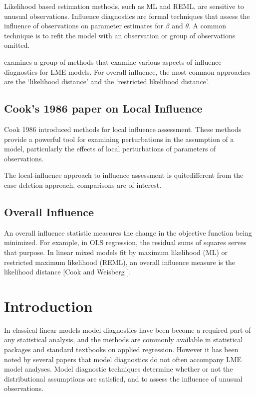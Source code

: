 \documentclass[12pt, a4paper]{article}
\begin{document}
Likelihood based estimation methods, such as ML and REML, are sensitive to unusual observations. Influence diagnostics are formal techniques that assess the influence of observations on parameter estimates for $\beta$ and $\theta$. A common technique is to refit the model with an observation or group of observations omitted.


\citet{west} examines a group of methods that examine various aspects of influence diagnostics for LME models.
For overall influence, the most common approaches are the `likelihood distance' and the `restricted likelihood distance'.


\subsection{Cook's 1986 paper on Local Influence}%
Cook 1986 introduced methods for local influence assessment. These methods provide a powerful tool for examining perturbations in the assumption of a model, particularly the effects of local perturbations of parameters of observations.


The local-influence approach to influence assessment is quitedifferent from the case deletion approach, comparisons are of
interest.






\subsection{Overall Influence}
An overall influence statistic measures the change in the objective function being minimized. For example, in
OLS regression, the residual sums of squares serves that purpose. In linear mixed models fit by
 maximum likelihood (ML) or  restricted maximum likelihood (REML), an overall influence measure is the  likelihood distance [Cook and Weisberg ].

			
			
			
			\section{Introduction}%
			In classical linear models model diagnostics have been become a required part of any statistical analysis, and the methods are commonly available in statistical packages and standard textbooks on applied regression. However it has been noted by several papers that model diagnostics do not often accompany LME model analyses.
			Model diagnostic techniques determine whether or not the distributional assumptions are satisfied, and to assess the influence of unusual observations.
			
\end{document}
